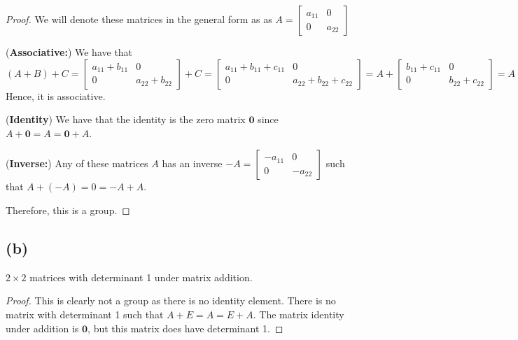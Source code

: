 \documentclass{article}
\begin{document}
\begin{proof}
    We will denote these matrices in the general form as as $A = \begin{bmatrix}
            a_{11} & 0      \\
            0      & a_{22}
        \end{bmatrix}$

    (\textbf{Associative:})
    We have that $(A + B) + C = \begin{bmatrix}
            a_{11} + b_{11} & 0               \\
            0               & a_{22} + b_{22}
        \end{bmatrix} + C = \begin{bmatrix}
            a_{11} + b_{11} + c_{11} & 0                        \\
            0                        & a_{22} + b_{22} + c_{22}
        \end{bmatrix} = A + \begin{bmatrix}
            b_{11} + c_{11} & 0               \\
            0               & b_{22} + c_{22}
        \end{bmatrix} = A + (B+C).$ Hence, it is associative.

    (\textbf{Identity}) We have that the identity is the zero matrix $\bm{0}$ since
    $A + \bm{0} = A = \bm{0} + A$.

    (\textbf{Inverse:}) Any of these matrices $A$ has an inverse $-A = \begin{bmatrix}
            -a_{11} & 0       \\
            0       & -a_{22}
        \end{bmatrix}$ such that $A + (-A) = 0 = -A + A$.

    Therefore, this is a group.
\end{proof}

\subsection*{(b)}
$2\times 2$ matrices with determinant 1 under matrix addition.

\begin{proof}
    This is clearly not a group as there is no identity element. There is no matrix with
    determinant 1 such that $A + E = A = E + A$. The matrix identity under addition
    is $\bm{0}$, but this matrix does have determinant 1.
\end{proof}
\end{document}
